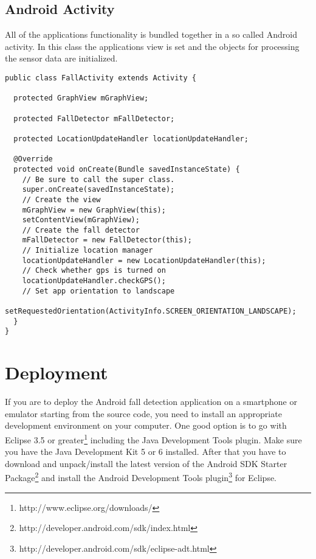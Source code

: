 \documentclass[a4paper, 10pt]{article}
\begin{document}
\subsection{Android Activity}
All of the applications functionality is bundled together in a so called Android activity. In this class the applications view is set and the objects for processing the sensor data are initialized.
\begin{lstlisting}
public class FallActivity extends Activity {

  protected GraphView mGraphView;

  protected FallDetector mFallDetector;

  protected LocationUpdateHandler locationUpdateHandler;

  @Override
  protected void onCreate(Bundle savedInstanceState) {
    // Be sure to call the super class.
    super.onCreate(savedInstanceState);
    // Create the view
    mGraphView = new GraphView(this);
    setContentView(mGraphView);
    // Create the fall detector
    mFallDetector = new FallDetector(this);
    // Initialize location manager
    locationUpdateHandler = new LocationUpdateHandler(this);
    // Check whether gps is turned on
    locationUpdateHandler.checkGPS();
    // Set app orientation to landscape
    setRequestedOrientation(ActivityInfo.SCREEN_ORIENTATION_LANDSCAPE);
  }
}
\end{lstlisting}

\section{Deployment}
If you are to deploy the Android fall detection application on a smartphone or emulator starting from the source code, you need to install an appropriate development environment on your computer. One good option is to go with Eclipse 3.5 or greater\footnote{http://www.eclipse.org/downloads/} including the Java Development Tools plugin. Make sure you have the Java Development Kit 5 or 6 installed. After that you have to download and unpack/install the latest version of the Android SDK Starter Package\footnote{http://developer.android.com/sdk/index.html} and install the Android Development Tools plugin\footnote{http://developer.android.com/sdk/eclipse-adt.html} for Eclipse. 
\end{document}
